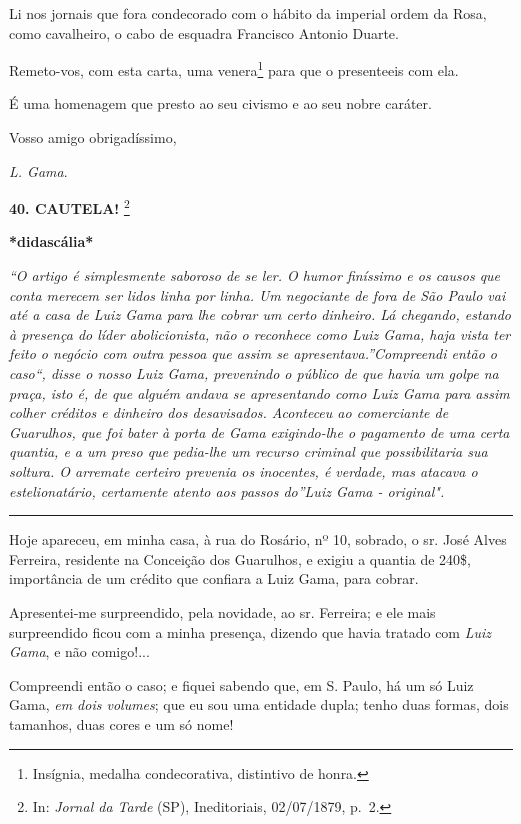 Li nos jornais que fora condecorado com o hábito da imperial ordem da
Rosa, como cavalheiro, o cabo de esquadra Francisco Antonio Duarte.

Remeto-vos, com esta carta, uma venera\footnote{Insígnia, medalha
  condecorativa, distintivo de honra.} para que o presenteeis com ela.

É uma homenagem que presto ao seu civismo e ao seu nobre caráter.

Vosso amigo obrigadíssimo,

\emph{L. Gama}.

\textbf{40. CAUTELA!} \footnote{In: \emph{Jornal da Tarde} (SP),
  Ineditoriais, 02/07/1879, p.~2.}

\textbf{*didascália*}

\emph{``O artigo é simplesmente saboroso de se ler. O humor finíssimo e
os causos que conta merecem ser lidos linha por linha. Um negociante de
fora de São Paulo vai até a casa de Luiz Gama para lhe cobrar um certo
dinheiro. Lá chegando, estando à presença do líder abolicionista, não o
reconhece como Luiz Gama, haja vista ter feito o negócio com outra
pessoa que assim se apresentava.''Compreendi então o caso``, disse o
nosso Luiz Gama, prevenindo o público de que havia um golpe na praça,
isto é, de que alguém andava se apresentando como Luiz Gama para assim
colher créditos e dinheiro dos desavisados. Aconteceu ao comerciante de
Guarulhos, que foi bater à porta de Gama exigindo-lhe o pagamento de uma
certa quantia, e a um preso que pedia-lhe um recurso criminal que
possibilitaria sua soltura. O arremate certeiro prevenia os inocentes, é
verdade, mas atacava o estelionatário, certamente atento aos passos
do''Luiz Gama - original". }

\begin{center}\rule{0.5\linewidth}{\linethickness}\end{center}

Hoje apareceu, em minha casa, à rua do Rosário, nº 10, sobrado, o sr.
José Alves Ferreira, residente na Conceição dos Guarulhos, e exigiu a
quantia de 240\$, importância de um crédito que confiara a Luiz Gama,
para cobrar.

Apresentei-me surpreendido, pela novidade, ao sr. Ferreira; e ele mais
surpreendido ficou com a minha presença, dizendo que havia tratado com
\emph{Luiz Gama}, e não comigo!...

Compreendi então o caso; e fiquei sabendo que, em S. Paulo, há um só
Luiz Gama, \emph{em dois volumes}; que eu sou uma entidade dupla; tenho
duas formas, dois tamanhos, duas cores e um só nome!

